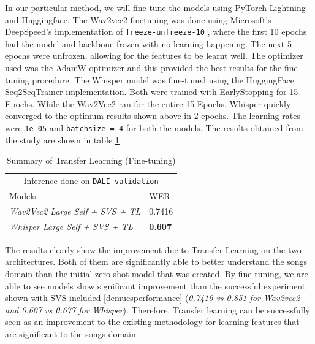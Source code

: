 In our particular method, we will fine-tune the models using PyTorch Lightning and Huggingface. The Wav2vec2 finetuning was done using Microsoft's DeepSpeed's implementation of \texttt{freeze-unfreeze-10} , where the first 10 epochs had the model and backbone frozen with no learning happening. The next 5 epochs were unfrozen, allowing for the features to be learnt well. The optimizer used was the AdamW optimizer and this provided the best results for the fine-tuning procedure. The Whisper model was fine-tuned using the HuggingFace Seq2SeqTrainer implementation. Both were trained with EarlyStopping for 15 Epochs. While the Wav2Vec2 ran for the entire 15 Epochs, Whisper quickly converged to the optimum results shown above in 2 epochs. The learning rates were \texttt{1e-05} and \texttt{batchsize = 4} for both the models. The results obtained from the study are shown in table \ref{transferlearning-performance-table}

\renewcommand{\arraystretch}{2}
\setlength{\arrayrulewidth}{0.3mm}
\begin{table}[H]
\small
\begin{center}
\begin{tabular}{ |p{7cm}| p{3cm}| }
\multicolumn{2}{c}{Inference done on \texttt{DALI-validation}} \\
\cline{1-2}
 Models     & WER  \\
\hline  \hline
 \textit{Wav2Vec2 Large Self + SVS + TL}    & 0.7416  \\
 \textit{Whisper Large Self + SVS + TL}   & \textbf{0.607}  \\
\hline  \hline
\end{tabular}
\caption{\label{transferlearning-performance-table} Summary of Transfer Learning (Fine-tuning)}
\end{center}
\end{table}


The results clearly show the improvement due to Transfer Learning on the two architectures. Both of them are significantly able to better understand the songs domain than the initial zero shot model that was created. By fine-tuning, we are able to see models show significant improvement than the successful experiment shown with SVS included \ref{demucsperformance} (\textit{0.7416 vs 0.851 for Wav2vec2 and 0.607 vs 0.677 for Whisper}). Therefore, Transfer learning can be successfully seen as an improvement to the existing methodology for learning features that are significant to the songs domain.


